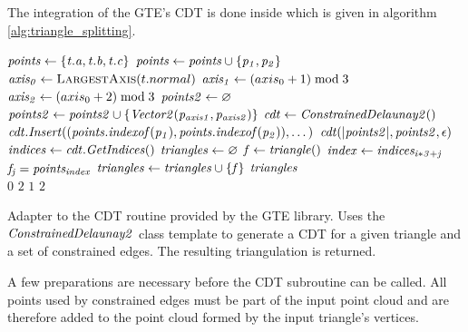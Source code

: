 The integration of the GTE's CDT is done inside  which is given in algorithm \ref{alg:triangle_splitting}.
%
\begin{algorithm}
	\centering
	\begin{algorithmic}[1]
			\State $\mathit{points} \gets \{\mathit{t.a}, \mathit{t.b}, \mathit{t.c}\}$ 
				\State $\mathit{points} \gets \mathit{points} \cup \{\mathit{p_1}, \mathit{p_2}\}$
			\EndFor
			\State $\var{axis_0} \gets \Call{LargestAxis}{t.normal}$
			\State $\mathit{axis_1} \gets (axis_0 + 1) \bmod 3$ 
			\State $\mathit{axis_2} \gets (axis_0 + 2) \bmod 3$
			\State $\mathit{points2} \gets \varnothing$ 
				\State $\mathit{points2} \gets \mathit{points2} \cup \{\mathit{Vector2}(\mathit{p_{axis1}}, \mathit{p_{axis2}})\}$
			\EndFor
			\State $\mathit{cdt} \gets \mathit{ConstrainedDelaunay2()}$
			 
				\State $\mathit{cdt.Insert}((\mathit{points.indexof}(\mathit{p_1}), \mathit{points.indexof}(\mathit{p_2})), \dots)$
			\EndFor
			\State $\mathit{cdt}(|\mathit{points2}|, \mathit{points2}, \epsilon)$ 
			\State $\mathit{indices} \gets \mathit{cdt.GetIndices()}$
			\State $\mathit{triangles} \gets \varnothing$
				\State $\mathit{f} \gets \mathit{triangle()}$
					\State $\mathit{index} \gets \mathit{indices_{i * 3 + j}}$
					\State $\mathit{f_j} = \mathit{points_{index}}$
				\EndFor
				\State $\mathit{triangles} \gets \mathit{triangles} \cup \{\mathit{f}\}$
			\EndFor
			\State \Return $\mathit{triangles}$
		\EndFunction
		\\
					\State \Return $0$
				\Else
					\State \Return $2$
				\EndIf
			\Else 
					\State \Return $1$
				\Else
					\State \Return $2$
				\EndIf
			\EndIf
		\EndFunction
	\end{algorithmic}
	\caption{
		Adapter to the CDT routine provided by the GTE library.
		Uses the $\mathit{ConstrainedDelaunay2}$ class template to generate a CDT for a given triangle and a set of constrained edges.
		The resulting triangulation is returned.
	}
	\label{alg:triangle_splitting}
\end{algorithm}
%
A few preparations are necessary before the CDT subroutine can be called.
All points used by constrained edges must be part of the input point cloud and are therefore added to the point cloud formed by the input triangle's vertices.

